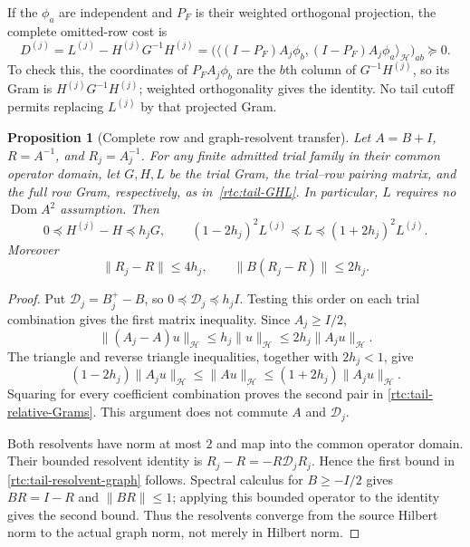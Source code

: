 \documentclass[11pt,a4paper]{article}
\numberwithin{equation}{section}
\newtheorem{proposition}[theorem]{Proposition}
\theoremstyle{definition}\newtheorem{definition}[theorem]{Definition}
\theoremstyle{remark}\newtheorem{remark}[theorem]{Remark}
\newcommand{\Hh}{\mathcal H}\newcommand{\Hw}{\mathcal H}
\newcommand{\ip}[2]{\langle#1,#2\rangle}\newcommand{\norm}[1]{\lVert#1\rVert}\newcommand{\abs}[1]{\lvert#1\rvert}
\begin{document}
If the $\phi_a$ are independent and $P_F$ is their weighted orthogonal
projection, the complete omitted-row cost is
\begin{equation}\label{rtc:tail-leakage}
 D^{(j)}=L^{(j)}-H^{(j)}G^{-1}H^{(j)}
 =\bigl(\ip{(I-P_F)A_j\phi_b}{(I-P_F)A_j\phi_a}_{\Hh}\bigr)_{ab}
 \succeq0.
\end{equation}
To check this, the coordinates of $P_FA_j\phi_b$ are the $b$th
column of $G^{-1}H^{(j)}$, so its Gram is
$H^{(j)}G^{-1}H^{(j)}$; weighted orthogonality gives the identity.
No tail cutoff permits replacing $L^{(j)}$ by that projected Gram.

\begin{proposition}[Complete row and graph-resolvent transfer]
\label{rtc:tail-relative}
Let $A=B+I$, $R=A^{-1}$, and $R_j=A_j^{-1}$.
For any finite admitted trial family in their common operator domain,
let $G,H,L$ be the trial Gram, the trial--row pairing matrix, and
the full row Gram, respectively, as in~\eqref{rtc:tail-GHL}.
In particular, $L$ requires no $\operatorname{Dom}A^2$ assumption.  Then
\begin{equation}\label{rtc:tail-relative-Grams}
 0\preceq H^{(j)}-H\preceq h_jG,\qquad
 (1-2h_j)^2L^{(j)}\preceq L\preceq(1+2h_j)^2L^{(j)}.
\end{equation}
Moreover
\begin{equation}\label{rtc:tail-resolvent-graph}
 \norm{R_j-R}\le4h_j,\qquad
 \norm{B(R_j-R)}\le2h_j.
\end{equation}
\end{proposition}
\begin{proof}
Put $\mathcal D_j=B_j^+-B$, so
$0\preceq\mathcal D_j\preceq h_jI$.  Testing this order on each
trial combination gives the first matrix inequality.  Since $A_j\ge I/2$,
\[
 \norm{(A_j-A)u}_{\Hh}\le h_j\norm{u}_{\Hh}
                     \le2h_j\norm{A_ju}_{\Hh}.
\]
The triangle and reverse triangle inequalities, together with $2h_j<1$,
give
\[
 (1-2h_j)\norm{A_ju}_{\Hh}
 \le\norm{Au}_{\Hh}
 \le(1+2h_j)\norm{A_ju}_{\Hh}.
\]
Squaring for every coefficient combination proves the second pair in
\eqref{rtc:tail-relative-Grams}.  This argument does not commute
$A$ and $\mathcal D_j$.

Both resolvents have norm at most $2$ and map into the common operator
domain.  Their bounded resolvent identity is
$R_j-R=-R\mathcal D_jR_j$.  Hence the first bound in
\eqref{rtc:tail-resolvent-graph} follows.  Spectral calculus for
$B\ge-I/2$ gives $BR=I-R$ and $\norm{BR}\le1$; applying this
bounded operator to the identity gives the second bound.  Thus the
resolvents converge from the source Hilbert norm to the actual graph
norm, not merely in Hilbert norm.
\end{proof}
\end{document}
